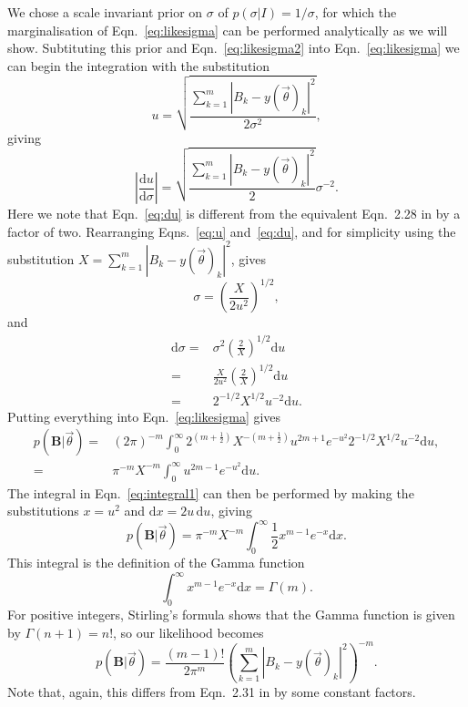 We chose a scale invariant prior on $\sigma$ of $p(\sigma|I) = 1/\sigma$, for which the marginalisation of
Eqn.~\ref{eq:likesigma} can be performed analytically as we will show.
Subtituting this prior and Eqn.~\ref{eq:likesigma2} into Eqn.~\ref{eq:likesigma} we can begin the
integration with the substitution
\begin{equation}\label{eq:u}
u = \sqrt{\frac{\sum_{k=1}^m|B_k-y(\vec{\theta})_k|^2}{2\sigma^2}},
\end{equation}
giving
\begin{equation}\label{eq:du}
\left|\frac{\text{d}u}{\text{d}\sigma}\right| = \sqrt{\frac{\sum_{k=1}^m|B_k-y(\vec{\theta})_k|^2}{2}}\sigma^{-2}.
\end{equation}
Here we note that Eqn.~\ref{eq:du} is different from the equivalent Eqn.~2.28 in \citet{Dupuisthesis} by a
factor of two. Rearranging Eqns.~\ref{eq:u} and~\ref{eq:du}, and for simplicity using the substitution $X =
\sum_{k=1}^m |B_k-y(\vec{\theta})_k|^2$, gives
\begin{equation}
\sigma = \left(\frac{X}{2u^2}\right)^{1/2},
\end{equation}
and
\begin{align}
\text{d}\sigma = & \sigma^2 \left(\frac{2}{X}\right)^{1/2} \text{d}u
\nonumber \\
 = & \frac{X}{2u^2} \left(\frac{2}{X}\right)^{1/2} \text{d}u \nonumber \\
 = & 2^{-1/2} X^{1/2} u^{-2} \text{d}u.
\end{align}
Putting everything into Eqn.~\ref{eq:likesigma} gives
\begin{align}\label{eq:integral1}
p(\mathbf{B}|\vec{\theta})= & (2\pi)^{-m} \int_0^{\infty} 2^{(m+\frac{1}{2})}
X^{-(m+\frac{1}{2})} u^{2m+1} e^{-u^2} 2^{-1/2} X^{1/2} u^{-2} \text{d}u, \nonumber \\
 = & \pi^{-m} X^{-m} \int_0^{\infty} u^{2m-1} e^{-u^2} \text{d}u.
\end{align}
The integral in Eqn.~\ref{eq:integral1} can then be performed by making the substitutions $x = u^2$ and $\text{d}x
= 2u\,\text{d}u$, giving
\begin{equation}
p(\mathbf{B}|\vec{\theta}) = \pi^{-m} X^{-m} \int_0^{\infty} \frac{1}{2} x^{m-1} e^{-x}
\text{d}x.
\end{equation}
This integral is the definition of the Gamma function
\begin{equation}
 \int_0^{\infty} x^{m-1} e^{-x} \text{d}x = \Gamma(m).
\end{equation}
For positive integers, Stirling's formula shows that the Gamma function is given by $\Gamma(n+1) = n!$, so our
likelihood becomes
\begin{equation}\label{eq:complex}
p(\mathbf{B}|\vec{\theta}) = \frac{(m-1)!}{2\pi^m} \left(\sum_{k=1}^m
|B_k-y(\vec{\theta})_k|^2\right)^{-m}.
\end{equation}
Note that, again, this differs from Eqn.~2.31 in \citet{Dupuisthesis} by some constant factors.

